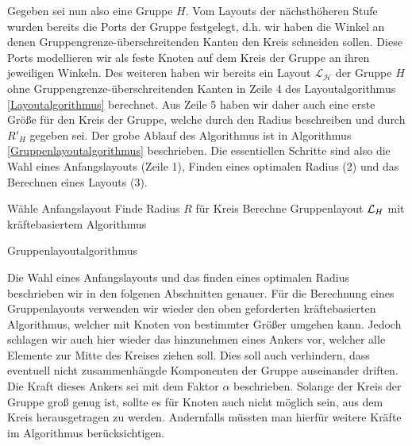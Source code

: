 
Gegeben sei nun also eine Gruppe $H$. Vom Layouts der nächsthöheren Stufe wurden bereits die Ports der Gruppe festgelegt, d.h. wir haben die Winkel an denen 
Gruppengrenze-überschreitenden Kanten den Kreis schneiden sollen. Diese Ports modellieren wir als feste Knoten auf dem Kreis der Gruppe an ihren jeweiligen Winkeln.
Des weiteren haben wir bereits ein Layout $\mathcal{L_H}$ der Gruppe $H$ ohne Gruppengrenze-überschreitenden Kanten in Zeile 4 des Layoutalgorithmus \ref{Layoutalgorithmus}  berechnet.
Aus Zeile 5 haben wir daher auch eine erste Größe für den Kreis der Gruppe, welche durch den Radius beschreiben und durch $R'_H$ gegeben sei. 
Der grobe Ablauf des Algorithmus ist in Algorithmus \ref{Gruppenlayoutalgorithmus} beschrieben. 
Die essentiellen Schritte sind also die Wahl eines Anfangslayouts (Zeile 1), Finden eines optimalen Radius (2) und das Berechnen eines Layouts (3).

\begin{algorithm}[H]
\label{Gruppenlayoutalgorithmus}
\SetAlgoLined
{} 
Wähle Anfangslayout\;
Finde Radius $R$ für Kreis\;
Berechne Gruppenlayout  $\mathcal{L}_H$ mit kräftebasiertem Algorithmus\;
\caption{Gruppenlayoutalgorithmus}
\end{algorithm}



Die Wahl eines Anfangslayouts und das finden eines optimalen Radius beschrieben wir  in den folgenen Abschnitten  genauer. 
Für die Berechnung eines Gruppenlayouts verwenden wir wieder den oben geforderten kräftebasierten Algorithmus, welcher mit Knoten von bestimmter Größer umgehen kann. 
Jedoch schlagen wir auch hier wieder das hinzunehmen eines Ankers vor, welcher alle Elemente zur Mitte des Kreises ziehen soll.
Dies soll auch verhindern, dass eventuell nicht zusammenhängde Komponenten der Gruppe auseinander driften. Die Kraft dieses Ankers sei mit dem Faktor $\alpha$ beschrieben. 
Solange der Kreis der Gruppe groß genug ist, sollte es für Knoten auch nicht möglich sein, aus dem Kreis herausgetragen zu werden. 
Andernfalls müssten man hierfür weitere Kräfte im Algorithmus berücksichtigen.

